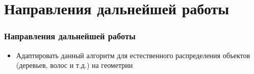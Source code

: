\documentclass[12pt, aspectratio=169]{beamer}
\begin{document}
\section{Направления дальнейшей работы}

\begin{frame}
\frametitle{Направления дальнейшей работы}

\begin{itemize}
\item Адаптировать данный алгоритм для естественного распределения объектов (деревьев, волос и т.д.) на геометрии
\end{itemize}
  
\end{frame}


\author
{
    И.Б.Рахимов \\
    Руководитель: О.Г.Корольков \\
    Спасибо за внимание
}
\begin{frame}[plain]
    \maketitle
\end{frame}
\end{document}
